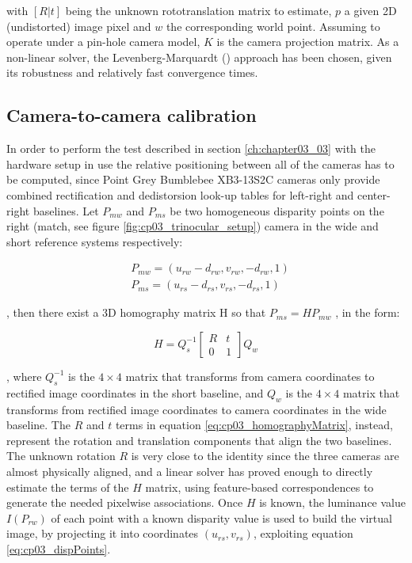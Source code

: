 with $[R|t]$ being the unknown rototranslation matrix to estimate, $p$ a given 2D (undistorted) image pixel and $w$ the corresponding world point. Assuming to operate under a pin-hole camera model, $K$ is the camera projection matrix. As a non-linear solver, the Levenberg-Marquardt (\cite{Levenberg1944}) approach has been chosen, given its robustness and relatively fast convergence times.

\subsection{Camera-to-camera calibration}\label{ch:chapter03_02_02}

In order to perform the test described in section \ref{ch:chapter03_03} with the hardware setup in use the relative positioning between all of the cameras has to be computed, since Point Grey Bumblebee\textregistered{} XB3-13S2C cameras only provide combined rectification and dedistorsion look-up tables for left-right and center-right baselines.
Let $P_{mw}$ and $P_{ms}$ be two homogeneous disparity points on the right (match, see figure \ref{fig:cp03_trinocular_setup}) camera in the wide and short reference systems respectively:

\begin{align}\label{eq:cp03_dispPoints}
& P_{mw} = (u_{rw} - d_{rw}, v_{rw}, -d_{rw}, 1) \nonumber \\
& P_{ms} = (u_{rs} - d_{rs}, v_{rs}, -d_{rs}, 1)
\end{align}

, then there exist a 3D homography matrix H so that $P_{ms} = HP_{mw}$ , in the form:

\begin{equation}\label{eq:cp03_homographyMatrix}
H = Q_s^{-1} \left[ \begin{array}{cc}
R & t \\
0 & 1 \end{array} \right] Q_w
\end{equation}

, where $Q_s^{-1}$ is the $4 \times 4$ matrix that transforms from camera coordinates to rectified image coordinates in the short baseline, and $Q_w$ is the $4 \times 4$ matrix that transforms from rectified image coordinates to camera coordinates in the wide baseline. The $R$ and $t$ terms in equation \ref{eq:cp03_homographyMatrix}, instead, represent the rotation and translation components that align the two baselines. The unknown rotation $R$ is very close to the identity since the three cameras are almost physically aligned, and a linear solver has proved enough to directly estimate the terms of the $H$ matrix, using feature-based correspondences to generate the needed pixelwise associations. Once $H$ is known, the luminance value $I(P_{rw})$ of each point with a known disparity value is used to build the virtual image, by projecting it into coordinates $(u_{rs} , v_{rs})$, exploiting equation \ref{eq:cp03_dispPoints}.

